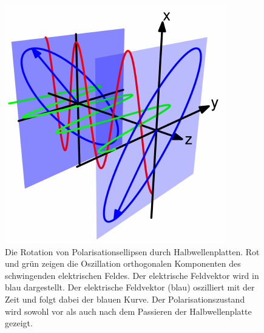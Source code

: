 \documentclass[a4paper,12pt,twoside,parskip=no,headsepline,open=right,ngerman,export]{scrreprt}
\begin{document}
            
            \begin{figure}[!b]
                \centering
                \includegraphics[height=0.2\textheight]{img/wellenplatte_eFeld.pdf}
                \caption[Rotation von Polarisationsellipsen]{Die Rotation von Polarisationsellipsen durch Halbwellenplatten. Rot und grün zeigen die Oszillation orthogonalen Komponenten des schwingenden elektrischen Feldes. Der elektrische Feldvektor wird in blau dargestellt. Der elektrische Feldvektor (blau) oszilliert mit der Zeit und folgt dabei der blauen Kurve. Der Polarisationszustand wird sowohl vor als auch nach dem Passieren der Halbwellenplatte gezeigt.}
                \label{fig:theo_wellenplatte_eFeld}
            \end{figure}
            
\end{document}
